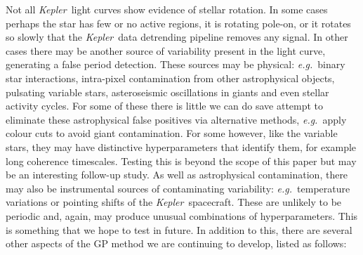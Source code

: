 \documentclass[useAMS, usenatbib, preprint, 12pt]{aastex}
\newcommand{\Kepler}{{\it Kepler}}
\newcommand{\kepler}{\Kepler}
\newcommand{\eg}{{\it e.g.}}
\begin{document}
Not all \kepler\ light curves show evidence of stellar rotation.
In some cases perhaps the star has few or no active regions, it is rotating
pole-on, or it rotates so slowly that the \kepler\ data detrending pipeline
removes any signal.
In other cases there may be another source of variability present in the light
curve, generating a false period detection.
These sources may be physical: \eg\ binary star interactions, intra-pixel
contamination from other astrophysical objects, pulsating variable stars,
asteroseismic oscillations in giants and even stellar activity cycles.
For some of these there is little we can do save attempt to eliminate these
astrophysical false positives via alternative methods, \eg\ apply colour cuts
to avoid giant contamination.
For some however, like the variable stars, they may have distinctive
hyperparameters that identify them, for example long coherence timescales.
Testing this is beyond the scope of this paper but may be an interesting
follow-up study.
As well as astrophysical contamination, there may also be instrumental sources
of contaminating variability: \eg\ temperature variations or pointing shifts
of the \kepler\ spacecraft.
These are unlikely to be periodic and, again, may produce unusual combinations
of hyperparameters.
This is something that we hope to test in future.
In addition to this, there are several other aspects of the GP method we are
continuing to develop, listed as follows:
\end{document}

